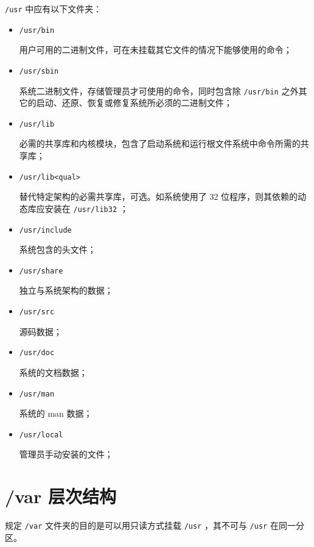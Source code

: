 \documentclass{utart}
\begin{document}
\texttt{/usr} 中应有以下文件夹：
\begin{itemize}[leftmargin=4em]
\item \texttt{/usr/bin}

  用户可用的二进制文件，可在未挂载其它文件的情况下能够使用的命令；
\item \texttt{/usr/sbin}

  系统二进制文件，存储管理员才可使用的命令，同时包含除 \texttt{/usr/bin} 之外其它的启动、还原、恢复或修复系统所必须的二进制文件；
\item \texttt{/usr/lib}

  必需的共享库和内核模块，包含了启动系统和运行根文件系统中命令所需的共享库；
\item \texttt{/usr/lib<qual>}

  替代特定架构的必需共享库，可选。如系统使用了 32 位程序，则其依赖的动态库应安装在 \texttt{/usr/lib32} ；
\item \texttt{/usr/include}

  系统包含的头文件；
\item \texttt{/usr/share}

  独立与系统架构的数据；
\item \texttt{/usr/src}

  源码数据；
\item \texttt{/usr/doc}

  系统的文档数据；
\item \texttt{/usr/man}

  系统的 man 数据；
\item \texttt{/usr/local}

  管理员手动安装的文件；
\end{itemize}

\section{/var 层次结构}
规定 \texttt{/var} 文件夹的目的是可以用只读方式挂载 \texttt{/usr} ，其不可与 \texttt{/usr} 在同一分区。
\end{document}
